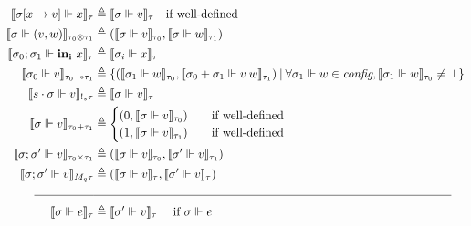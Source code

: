 \begin{definition}
\begin{equation}
\begin{aligned}[c]
  \llbracket \sigma [x \mapsto v] \Vdash x \rrbracket_{\tau} &\triangleq
    \llbracket \sigma \Vdash v \rrbracket_{\tau} \quad \text{if well-defined} \\
  \llbracket \sigma \Vdash (v, w) \rrbracket_{\tau_0 \otimes \tau_1} &\triangleq
    (\llbracket \sigma \Vdash v \rrbracket_{\tau_0}, \llbracket \sigma \Vdash w
    \rrbracket_{\tau_1}) \\
  \llbracket \sigma_0; \sigma_1 \Vdash \mathbf{in_i} \ x \rrbracket_{\tau}
    &\triangleq \llbracket \sigma_i \Vdash x \rrbracket_{\tau} \\
  \llbracket \sigma_0 \Vdash v \rrbracket_{\tau_0 \multimap \tau_1}
    &\triangleq \{ (\llbracket \sigma_1 \Vdash w \rrbracket_{\tau_0}, \llbracket
    \sigma_0 + \sigma_1 \Vdash v \> w \rrbracket_{\tau_1}) \> | \>
    \forall \sigma_1 \Vdash w \in \textit{config}, \llbracket \sigma_1 \Vdash w
    \rrbracket_{\tau_0} \not= \bot \} \\
    \llbracket s \cdot \sigma \Vdash v \rrbracket_{!_s \tau} &\triangleq \llbracket
    \sigma \Vdash v \rrbracket_\tau \\
  \llbracket \sigma \Vdash v \rrbracket_{\tau_0 + \tau_1} &\triangleq
    \begin{cases}
      (0, \llbracket \sigma \Vdash v \rrbracket_{\tau_0}) \quad &\text{if well-defined} \\
      (1, \llbracket \sigma \Vdash v \rrbracket_{\tau_1}) \quad &\text{if well-defined}
    \end{cases} \\
  \llbracket \sigma; \sigma' \Vdash v \rrbracket_{\tau_0 \times \tau_1}
    &\triangleq (\llbracket \sigma \Vdash v \rrbracket_{\tau_0}, \llbracket
    \sigma' \Vdash v \rrbracket_{\tau_1}) \\
  \llbracket \sigma; \sigma' \Vdash v \rrbracket_{M_q \tau} &\triangleq
    (\llbracket \sigma \Vdash v \rrbracket_{\tau}, \llbracket \sigma' \Vdash v
    \rrbracket_{\tau}) \\
  \rule{5em}{0.4pt}&\rule{30em}{0.4pt}\\
  \llbracket \sigma \Vdash e \rrbracket_{\tau} &\triangleq \llbracket \sigma'
    \Vdash v\rrbracket_{\tau} \quad{\text{ if } \sigma \Vdash e
}
\end{aligned}
\end{equation}
\end{definition}
